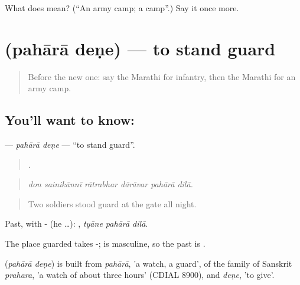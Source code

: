 \begin{tcolorbox}[breakable,colback=teal!4,colframe=teal!35!black,title={Before you move on}]
What does  mean? (\textquotedblleft{}An army camp; a camp\textquotedblright{}.) Say it once more.
\end{tcolorbox}
\section[\texorpdfstring{\mr{पहारा} \mr{देणे} (pahārā deṇe)}{पहारा देणे (pahārā deṇe)}]{  (pahārā deṇe) — to stand guard}

\label{lesson:MR-C330-pahara-dene}



\begin{quote}
Before the new one: say the Marathi for infantry, then the Marathi for an army camp.
\end{quote}

\subsection*{You'll want to know:  }
\textbf{ } — \emph{pahārā deṇe} — \textquotedblleft{}to stand guard\textquotedblright{}.

\begin{quote}
     .
\end{quote}

\begin{quote}
\emph{don sainikānnī rātrabhar dārāvar pahārā dilā.}
\end{quote}

\begin{quote}
Two soldiers stood guard at the gate all night.
\end{quote}

Past, with - (he …):   , \emph{tyāne pahārā dilā}.

The place guarded takes -;  is masculine, so the past is  .

\begin{cousinweb}
\textbf{ } (\emph{pahārā deṇe}) is built from \emph{pahārā}, 'a watch, a guard', of the family of Sanskrit \emph{prahara}, 'a watch of about three hours' (CDIAL 8900), and \emph{deṇe}, 'to give'.
\end{cousinweb}

